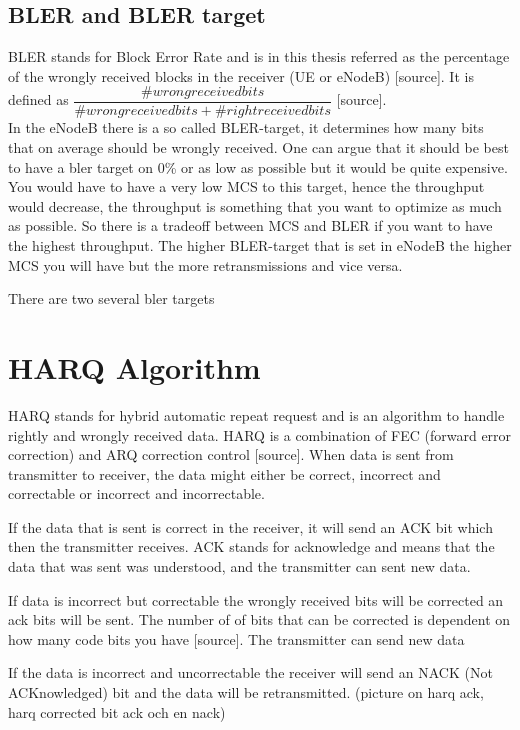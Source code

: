 \documentclass[cropmarks, frame, english]{idamasterthesis}
\begin{document}
\subsection{BLER and BLER target}
BLER stands for Block Error Rate and is in this thesis referred as the percentage of the wrongly received blocks in the receiver (UE or eNodeB) [source]. It is defined as $\dfrac{\# wrong received bits}{ \# wrong received bits + \# right received bits}$ [source]. \\

In the eNodeB there is a so called BLER-target, it determines how many bits that on average should be wrongly received. One can argue that it should be best to have a bler target on 0\% or as low as possible but it would be quite expensive. You would have to have a very low MCS to this target, hence the throughput would decrease, the throughput is something that you want to optimize as much as possible. So there is a tradeoff between MCS and BLER if you want to have the highest throughput. The higher BLER-target that is set in eNodeB the higher MCS you will have but the more retransmissions and vice versa.

There are two several bler targets





\section{HARQ Algorithm}
HARQ stands for hybrid automatic repeat request and is an algorithm to handle rightly and wrongly received data. HARQ is a combination of FEC (forward error correction) and ARQ correction control [source]. When data is sent from transmitter to receiver, the data might either be correct, incorrect and correctable or incorrect and incorrectable.

If the data that is sent is correct in the receiver, it will send an ACK bit which then the transmitter receives. ACK stands for acknowledge and means that the data that was sent was understood, and the transmitter can sent new data.

If data is incorrect but correctable the wrongly received bits will be corrected an ack bits will be sent. The number of of bits that can be corrected is dependent on how many code bits you have [source]. The transmitter can send new data

If the data is incorrect and uncorrectable the receiver will send an NACK (Not ACKnowledged) bit and the data will be retransmitted.
(picture on harq ack, harq corrected bit ack och en nack)
\end{document}
